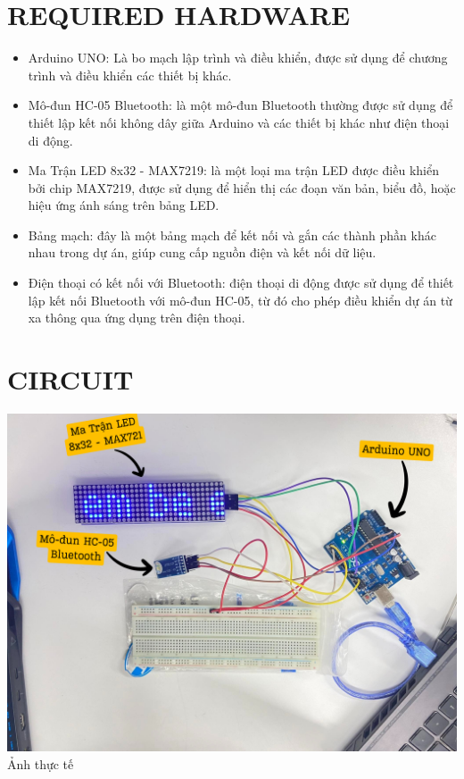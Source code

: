 \documentclass[conference]{IEEEtran}
\begin{document}
\section{\textbf{REQUIRED HARDWARE}}
\begin{itemize}
    \item Arduino UNO: Là bo mạch lập trình và điều khiển, được sử dụng để chương trình và điều khiển các thiết bị khác.
    \item Mô-đun HC-05 Bluetooth: là một mô-đun Bluetooth thường được sử dụng để thiết lập kết nối không dây giữa Arduino và các thiết bị khác như điện thoại di động.
    \item Ma Trận LED 8x32 - MAX7219: là một loại ma trận LED được điều khiển bởi chip MAX7219, được sử dụng để hiển thị các đoạn văn bản, biểu đồ, hoặc hiệu ứng ánh sáng trên bảng LED.
    \item Bảng mạch: đây là một bảng mạch để kết nối và gắn các thành phần khác nhau trong dự án, giúp cung cấp nguồn điện và kết nối dữ liệu.
    \item Điện thoại có kết nối với Bluetooth: điện thoại di động được sử dụng để thiết lập kết nối Bluetooth với mô-đun HC-05, từ đó cho phép điều khiển dự án từ xa thông qua ứng dụng trên điện thoại.
\end{itemize}

\section{\textbf{CIRCUIT}}

    \centering
    \includegraphics[width=1\linewidth]{HinhThucTe.png}\\
    \caption{Ảnh thực tế}
    \label{fig:enter-label}
\end{document}
